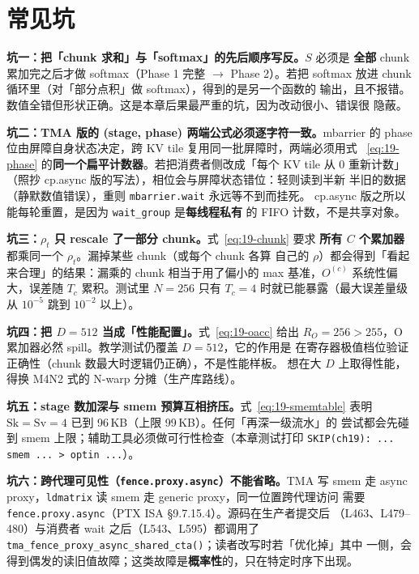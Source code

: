 \section{常见坑}

\textbf{坑一：把「chunk 求和」与「softmax」的先后顺序写反。}$S$ 必须是
\textbf{全部} chunk 累加完之后才做 softmax（Phase 1 完整 $\to$ Phase 2）。若把
softmax 放进 chunk 循环里（对「部分点积」做 softmax），得到的是另一个函数的
输出，且不报错。数值全错但形状正确。这是本章后果最严重的坑，因为改动很小、错误很
隐蔽。

\textbf{坑二：TMA 版的 (stage, phase) 两端公式必须逐字符一致。}\allowbreak{}mbarrier 的
phase 位由屏障自身状态决定，跨 KV tile 复用同一批屏障时，两端必须用式
~\ref{eq:19-phase} 的\textbf{同一个扁平计数器}。若把消费者侧改成「每个 KV tile
从 0 重新计数」（照抄 cp.async 版的写法），相位会与屏障状态错位：轻则读到半新
半旧的数据（静默数值错误），重则 \texttt{mbarrier.\allowbreak{}wait} 永远等不到而挂死。
cp.async 版之所以能每轮重置，是因为 \texttt{wait\_group} 是\textbf{每线程私有}
的 FIFO 计数，不是共享对象。

\textbf{坑三：$\rho_t$ 只 rescale 了一部分 chunk。}式~\ref{eq:19-chunk} 要求
\textbf{所有 $C$ 个累加器}都乘同一个 $\rho_t$。漏掉某些 chunk（或每个 chunk 各算
自己的 $\rho$）都会得到「看起来合理」的结果：漏乘的 chunk 相当于用了偏小的
max 基准，$O^{(c)}$ 系统性偏大，误差随 $T_c$ 累积。测试里 $N{=}256$ 只有
$T_c{=}4$ 时就已能暴露（最大误差量级从 $10^{-5}$ 跳到 $10^{-2}$ 以上）。

\textbf{坑四：把 $D{=}512$ 当成「性能配置」。}式~\ref{eq:19-oacc} 给出
$R_O = 256 > 255$，O 累加器必然 spill。教学测试仍覆盖 $D{=}512$，它的作用是
在寄存器极值档位验证正确性（chunk 数最大时逻辑仍正确），不是性能样板。
想在大 $D$ 上取得性能，得换 M4N2 式的 N-warp 分摊（生产库路线）。

\textbf{坑五：stage 数加深与 smem 预算互相挤压。}式~\ref{eq:19-smemtable} 表明
$\mathrm{Sk}=\mathrm{Sv}=4$ 已到 96\,KB（上限 99\,KB）。任何「再深一级流水」的
尝试都会先碰到 smem 上限；辅助工具必须做可行性检查（本章测试打印
\texttt{SKIP(ch19): ... smem ... > optin ...}）。

\textbf{坑六：跨代理可见性（\texttt{fence.\allowbreak{}proxy.\allowbreak{}async}）不能省略。}\allowbreak{}TMA 写 smem
走 async proxy，\texttt{ldmatrix} 读 smem 走 generic proxy，同一位置跨代理访问
需要 \texttt{fence.\allowbreak{}proxy.\allowbreak{}async}（PTX ISA §9.7.15.4）。源码在生产者提交后
（L463、L479--480）与消费者 wait 之后（L543、L595）都调用了
\texttt{tma\_\allowbreak{}fence\_\allowbreak{}proxy\_\allowbreak{}async\_\allowbreak{}shared\_\allowbreak{}cta\allowbreak{}()}；读者改写时若「优化掉」其中
一侧，会得到偶发的读旧值故障；这类故障是\textbf{概率性}的，只在特定时序下出现。

